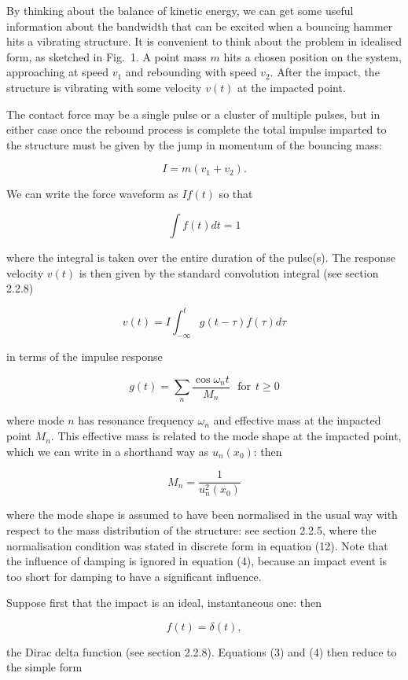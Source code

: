   By thinking about the balance of kinetic energy, we can get some useful 
  information about the bandwidth that can be excited when a bouncing hammer 
  hits a vibrating structure. It is convenient to think about the problem in 
  idealised form, as sketched in Fig.\ 1. A point mass $m$ hits a chosen 
  position on the system, approaching at speed $v_1$ and rebounding with speed 
  $v_2$. After the impact, the structure is vibrating with some velocity $v(t)$ 
  at the impacted point. 

  The contact force may be a single pulse or a cluster of multiple pulses, but 
  in either case once the rebound process is complete the total impulse 
  imparted to the structure must be given by the jump in momentum of the 
  bouncing mass: 

  $$I=m(v_1+v_2). \tag{1}$$ 

  We can write the force waveform as $I f(t)$ so that 

  $$\int{f(t) dt} = 1 \tag{2}$$ 

  where the integral is taken over the entire duration of the pulse(s). The 
  response velocity $v(t)$ is then given by the standard convolution integral 
  (see section 2.2.8) 

  $$v(t)=I \int_{-\infty}^t{g(t-\tau) f(\tau) d \tau} \tag{3}$$ 

  in terms of the impulse response 

  $$g(t) = \sum_n{\dfrac{\cos \omega_n t}{M_n}} \mathrm{~~~for~~} t\ge 0 
  \tag{4}$$ 

  where mode $n$ has resonance frequency $\omega_n$ and effective mass at the 
  impacted point $M_n$. This effective mass is related to the mode shape at the 
  impacted point, which we can write in a shorthand way as $u_n(x_0)$: then 

  $$M_n=\dfrac{1}{u_n^2(x_0)} \tag{5}$$ 

  where the mode shape is assumed to have been normalised in the usual way with 
  respect to the mass distribution of the structure: see section 2.2.5, where 
  the normalisation condition was stated in discrete form in equation (12). 
  Note that the influence of damping is ignored in equation (4), because an 
  impact event is too short for damping to have a significant influence. 

  Suppose first that the impact is an ideal, instantaneous one: then 

  $$f(t) = \delta(t), \tag{6}$$ 

  the Dirac delta function (see section 2.2.8). Equations (3) and (4) then 
  reduce to the simple form 

